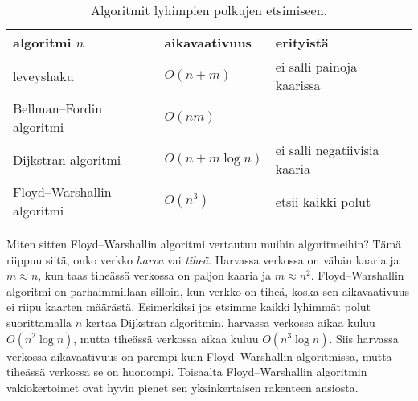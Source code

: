 \begin{table}
\center
\begin{tabular}{lll}
algoritmi $n$ & aikavaativuus & erityistä \\
\hline
leveyshaku & $O(n+m)$ & ei salli painoja kaarissa \\
Bellman–Fordin algoritmi & $O(nm)$ & \\
Dijkstran algoritmi & $O(n+m \log n)$ & ei salli negatiivisia kaaria \\
Floyd–Warshallin algoritmi & $O(n^3)$ & etsii kaikki polut \\
\end{tabular}
\caption{Algoritmit lyhimpien polkujen etsimiseen.}
\label{tab:reiver}
\end{table}

Miten sitten Floyd–Warshallin algoritmi vertautuu muihin algoritmeihin?
Tämä riippuu siitä, onko verkko \emph{harva} vai \emph{tiheä}.
Harvassa verkossa on vähän kaaria ja $m \approx n$,
kun taas tiheässä verkossa on paljon kaaria ja $m \approx n^2$.
Floyd–Warshallin algoritmi on parhaimmillaan silloin,
kun verkko on tiheä, koska sen aikavaativuus ei riipu
kaarten määrästä.
Esimerkiksi jos etsimme kaikki lyhimmät polut
suorittamalla $n$ kertaa Dijkstran algoritmin,
harvassa verkossa aikaa kuluu $O(n^2 \log n)$,
mutta tiheässä verkossa aikaa kuluu $O(n^3 \log n)$.
Siis harvassa verkossa aikavaativuus on parempi
kuin Floyd–Warshallin algoritmissa,
mutta tiheässä verkossa se on huonompi.
Toisaalta Floyd–Warshallin algoritmin vakiokertoimet
ovat hyvin pienet sen yksinkertaisen rakenteen ansiosta.